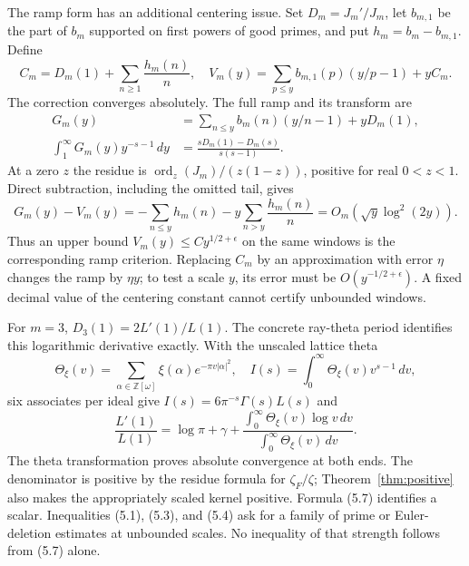 \documentclass[11pt]{article}
\newcommand{\Z}{\mathbb Z}
\newcommand{\ord}{\operatorname{ord}}
\begin{document}
The ramp form has an additional centering issue. Set $D_m=J_m'/J_m$, let $b_{m,1}$ be the part of $b_m$ supported on first powers of good primes, and put $h_m=b_m-b_{m,1}$. Define
\[
 C_m=D_m(1)+\sum_{n\ge1}\frac{h_m(n)}n,
 \quad
 V_m(y)=\sum_{p\le y}b_{m,1}(p)(y/p-1)+yC_m.
 \tag{5.4}
\]
The correction converges absolutely. The full ramp and its transform are
\[
 \begin{split}
 G_m(y)&=\sum_{n\le y}b_m(n)(y/n-1)+yD_m(1),\\
 \int_1^\infty G_m(y)y^{-s-1}\,dy
     &=\frac{sD_m(1)-D_m(s)}{s(s-1)}.
 \end{split}
 \tag{5.5}
\]
At a zero $z$ the residue is $\ord_z(J_m)/(z(1-z))$, positive for real $0<z<1$. Direct subtraction, including the omitted tail, gives
\[
 G_m(y)-V_m(y)
    =-\sum_{n\le y}h_m(n)-y\sum_{n>y}\frac{h_m(n)}n
    =O_m(\sqrt y\log^2(2y)).
 \tag{5.6}
\]
Thus an upper bound $V_m(y)\le C y^{1/2+\epsilon}$ on the same windows is the corresponding ramp criterion. Replacing $C_m$ by an approximation with error $\eta$ changes the ramp by $\eta y$; to test a scale $y$, its error must be $O(y^{-1/2+\epsilon})$. A fixed decimal value of the centering constant cannot certify unbounded windows.

For $m=3$, $D_3(1)=2L'(1)/L(1)$. The concrete ray-theta period identifies this logarithmic derivative exactly. With the unscaled lattice theta
\[
 \Theta_\xi(v)=\sum_{\alpha\in\Z[\omega]}\xi(\alpha)e^{-\pi v|\alpha|^2},
 \quad I(s)=\int_0^\infty\Theta_\xi(v)v^{s-1}\,dv,
\]
six associates per ideal give $I(s)=6\pi^{-s}\Gamma(s)L(s)$ and
\[
 \frac{L'(1)}{L(1)}=\log\pi+\gamma+
       \frac{\int_0^\infty\Theta_\xi(v)\log v\,dv}
            {\int_0^\infty\Theta_\xi(v)\,dv}.
 \tag{5.7}
\]
The theta transformation proves absolute convergence at both ends. The denominator is positive by the residue formula for $\zeta_F/\zeta$; Theorem~\ref{thm:positive} also makes the appropriately scaled kernel positive. Formula (5.7) identifies a scalar. Inequalities (5.1), (5.3), and (5.4) ask for a family of prime or Euler-deletion estimates at unbounded scales. No inequality of that strength follows from (5.7) alone.
\end{document}
